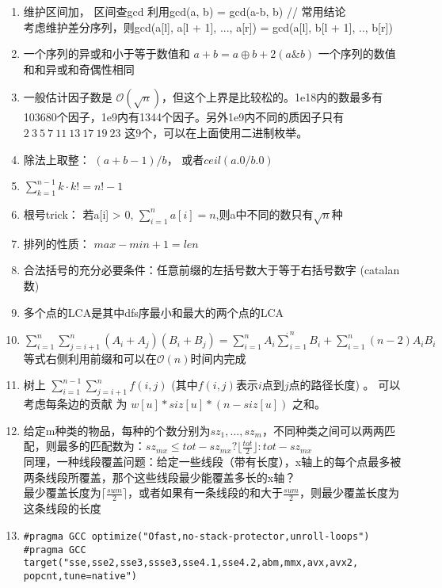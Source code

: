 \documentclass[a4paper]{ctexart}
\begin{document}
\begin{enumerate}
	\item 维护区间加， 区间查gcd
	利用gcd(a, b) = gcd(a-b, b)  // 常用结论 \\
	考虑维护差分序列，则gcd(a[l], a[l + 1], ..., a[r]) = gcd(a[l], b[l + 1], .., b[r])
	\item
	  \subitem 一个序列的异或和小于等于数值和 $a+b=a \oplus b+2(a \& b)$
	  \subitem 一个序列的数值和和异或和奇偶性相同

	\item 一般估计因子数是 $\mathcal{O}(\sqrt{n})$，但这个上界是比较松的。1e18内的数最多有103680个因子，1e9内有1344个因子。另外1e9内不同的质因子只有 $2\ 3\ 5\ 7\ 11\ 13\ 17\ 19\ 23$ 这9个，可以在上面使用二进制枚举。

	\item 除法上取整： $(a + b - 1) / b$， 或者$ceil(a.0 / b.0)$
	\item $\sum_{k=1}^{n-1}{k \cdot k!} = n! - 1$
	\item 根号trick：
	若a[i] > 0, $\sum_{i=1}^{n} a[i] = n$,则a中不同的数只有$\sqrt{n}$种
	\item 排列的性质： $ max - min + 1 = len $
	\item 合法括号的充分必要条件：任意前缀的左括号数大于等于右括号数字 (catalan数)
	\item 多个点的LCA是其中dfs序最小和最大的两个点的LCA
	\item $\sum_{i = 1}^{n}\sum_{j = i + 1}^{n}(A_i + A_j)(B_i + B_j) = \sum_{i = 1}^{n}A_i \dot \sum_{i = 1}^{n}B_i + \sum_{i = 1}^{n}(n - 2)A_i B_i$等式右侧利用前缀和可以在$\mathcal{O}(n)$时间内完成
	\item 树上 $\sum_{i=1}^{n-1}\sum_{j=i+1}^{n}f(i, j) $ (其中$f(i, j)$表示$i$点到$j$点的路径长度) 。 可以考虑每条边的贡献 为 $w[u] * siz[u] * (n - siz[u])$ 之和。
	\item 给定m种类的物品，每种的个数分别为$sz_1, ... , sz_m$，不同种类之间可以两两匹配，则最多的匹配数为：$sz_{mx} \leq tot - sz_{mx} ? \lfloor \frac{tot}{2} \rfloor : tot - sz_{mx} $ \\ 同理，一种线段覆盖问题：给定一些线段（带有长度），x轴上的每个点最多被两条线段所覆盖，那个这些线段最少能覆盖多长的x轴？\\
	最少覆盖长度为$\lceil \frac{sum}{2} \rceil $，或者如果有一条线段的和大于$\frac{sum}{2}$，则最少覆盖长度为这条线段的长度
	\item 
	\begin{verbatim}
#pragma GCC optimize("Ofast,no-stack-protector,unroll-loops")
#pragma GCC target("sse,sse2,sse3,ssse3,sse4.1,sse4.2,abm,mmx,avx,avx2,
popcnt,tune=native")
	\end{verbatim}

	
\end{enumerate}
\end{document}
